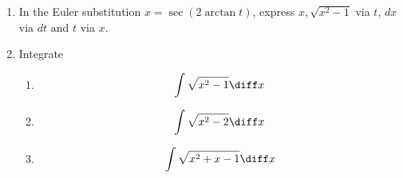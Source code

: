 \begin{enumerate}
\item In the Euler substitution $x=\sec (2\arctan t)$, express  $x,\sqrt{x^2-1} $ via $t$, $dx$ via $dt$ and $t$ via $x$.
\item Integrate
\begin{enumerate}
\item 
\[
\int \sqrt{x^2-1}\diff x
\]
\item 
\[
\int \sqrt{x^2-2}\diff x
\]
\item 
\[
\int \sqrt{x^2+x-1}\diff x
\]
\end{enumerate}


\end{enumerate}
